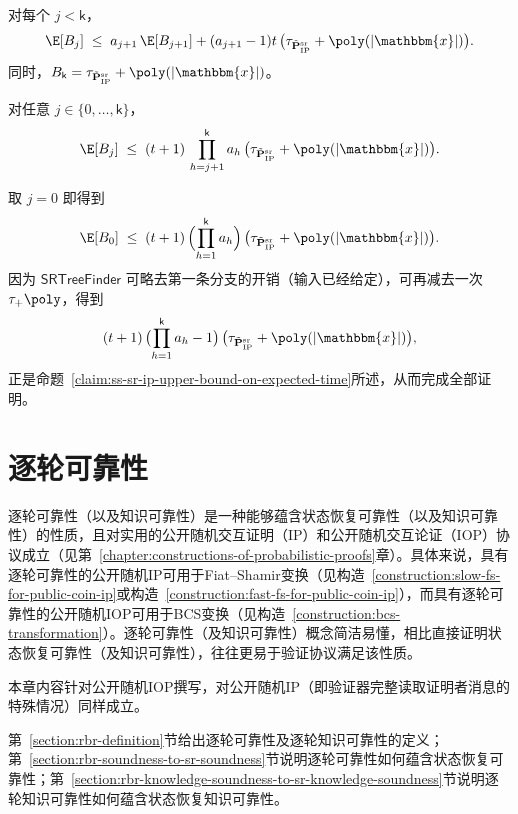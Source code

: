 \documentclass[american,singlepageview]{snargs-book-zh}
\newcommand{\Malicious}[1]{\tilde{#1}}
\newcommand{\Instance}{\mathbbm{x}}
\newcommand{\ProtoProver}{P}
\newcommand{\ProtoRoundComplexity}{\mathsf{k}}
\newcommand{\SRSuperscript}{\mathrm{sr}}
\newcommand{\IPSubscript}{\scriptscriptstyle\mathrm{IP}}
\newcommand{\IPFormat}[1]{\mathbf{#1}}
\newcommand{\IPMaliciousProver}{\Malicious{\IPFormat{\ProtoProver}}_{\IPSubscript}}
\newcommand{\IPRoundComplexity}{\ProtoRoundComplexity}
\newcommand{\ProverRunningTime}[1]{\tau_{#1}}
\newcommand{\SRBudget}{t}
\newcommand{\IPMaliciousSRProver}{\IPMaliciousProver^{\SRSuperscript}}
\newcommand{\SSArity}{a}
\newcommand{\SSSRTreeFinder}{\mathsf{SRTreeFinder}}
\newcommand{\SSFinderTime}{B}
\begin{document}
\begin{claim}
\label{claim:ss-sr-ip-fail-running-time-recursion}
对每个 $j<\IPRoundComplexity$，
\[
\E[\SSFinderTime_{j}]
\;\le\;
\SSArity_{j+1}\,\E[\SSFinderTime_{j+1}]
+(\SSArity_{j+1}-1)\SRBudget\,
\bigl(\ProverRunningTime{\IPMaliciousSRProver}+\poly(|\Instance|)\bigr).
\]
同时，$\SSFinderTime_{\IPRoundComplexity}
=\ProverRunningTime{\IPMaliciousSRProver}+\poly(|\Instance|)$。
\end{claim}

\begin{claim}[运行时间上界]
\label{claim:ss-sr-ip-intermediate-expected-time}
对任意 $j\in\{0,\dots,\IPRoundComplexity\}$，
\[
\E[\SSFinderTime_{j}]
\;\le\;
(\SRBudget+1)\,\prod_{h=j+1}^{\IPRoundComplexity}\SSArity_{h}\,
\bigl(\ProverRunningTime{\IPMaliciousSRProver}+\poly(|\Instance|)\bigr).
\]
\end{claim}

\noindent 取 $j=0$ 即得到
\[
\E[\SSFinderTime_{0}]
\;\le\;
(\SRBudget+1)\,\Bigl(\prod_{h=1}^{\IPRoundComplexity}\SSArity_{h}\Bigr)\,
\bigl(\ProverRunningTime{\IPMaliciousSRProver}+\poly(|\Instance|)\bigr).
\]
因为 $\SSSRTreeFinder$ 可略去第一条分支的开销（输入已经给定），可再减去一次 $\ProverRunningTime+\poly$，得到
\[
(\SRBudget+1)\,\bigl(\prod_{h=1}^{\IPRoundComplexity}\SSArity_{h}-1\bigr)\,
\bigl(\ProverRunningTime{\IPMaliciousSRProver}+\poly(|\Instance|)\bigr),
\]
正是命题~\ref{claim:ss-sr-ip-upper-bound-on-expected-time}所述，从而完成全部证明。

\chapter{逐轮可靠性}
\label{chapter:rbr-soundness}

逐轮可靠性（以及知识可靠性）是一种能够蕴含状态恢复可靠性（以及知识可靠性）的性质，且对实用的公开随机交互证明（IP）和公开随机交互论证（IOP）协议成立（见第~\ref{chapter:constructions-of-probabilistic-proofs}章）。具体来说，具有逐轮可靠性的公开随机IP可用于Fiat--Shamir变换（见构造~\ref{construction:slow-fs-for-public-coin-ip}或构造~\ref{construction:fast-fs-for-public-coin-ip}），而具有逐轮可靠性的公开随机IOP可用于BCS变换（见构造~\ref{construction:bcs-transformation}）。逐轮可靠性（及知识可靠性）概念简洁易懂，相比直接证明状态恢复可靠性（及知识可靠性），往往更易于验证协议满足该性质。

本章内容针对公开随机IOP撰写，对公开随机IP（即验证器完整读取证明者消息的特殊情况）同样成立。

第~\ref{section:rbr-definition}节给出逐轮可靠性及逐轮知识可靠性的定义；第~\ref{section:rbr-soundness-to-sr-soundness}节说明逐轮可靠性如何蕴含状态恢复可靠性；第~\ref{section:rbr-knowledge-soundness-to-sr-knowledge-soundness}节说明逐轮知识可靠性如何蕴含状态恢复知识可靠性。
\end{document}
